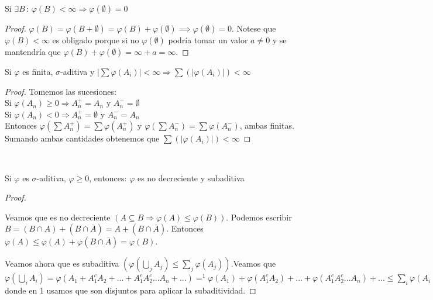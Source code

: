 \begin{lemma}
Si $\exists B\, : \, \varphi(B)<\infty \Rightarrow \varphi(\emptyset)=0$
\end{lemma}
\begin{proof}
  $\varphi(B) =  \varphi(B+\emptyset) = \varphi(B) + \varphi(\emptyset)\implies \varphi(\emptyset) = 0$. Notese que $\varphi(B)<\infty$ es obligado porque si no $\varphi(\emptyset)$ podría tomar un valor $a \neq 0$ y se mantendría que  $\varphi(B) + \varphi(\emptyset) = \infty + a = \infty$.
\end{proof}


\begin{theorem}
Si $\varphi$ es finita, $\sigma$-aditiva y $\displaystyle|\sum\varphi(A_i)|<\infty\Rightarrow\displaystyle\sum(\vert \varphi(A_i)\vert)<\infty$
\end{theorem}
\begin{proof}
Tomemos las sucesiones: \\
Si $\varphi(A_n)\geq 0 \Longrightarrow A_n^{+}=A_n$ y $A_n^{-}=\emptyset$\\
Si $\varphi(A_n)<0 \Longrightarrow A_n^{+}=\emptyset$ y $A_n^{-}=A_n$\\
Entonces $\varphi(\displaystyle\sum A_n^{+})=\displaystyle\sum\varphi(A_n^{+})$ y $\varphi(\displaystyle\sum A_n^{-})=\displaystyle\sum\varphi(A_n^{-})$, ambas finitas. Sumando ambas cantidades obtenemos que $\displaystyle\sum(\vert \varphi(A_i)\vert)<\infty$


\end{proof}

\begin{theorem}
  \ 
  
Si $\varphi$ es $\sigma$-aditiva, $\varphi \geq 0$, entonces: $\varphi$ es no decreciente y subaditiva
\end{theorem}

\begin{proof}
  \
   
Veamos que es no decreciente $(A \subseteq B \Rightarrow \varphi (A) \leq \varphi (B))$. Podemos escribir $B = (B \cap A) + (B \cap \overline{A}) = A + (B \cap \overline{A})$. Entonces $\varphi (A) \leq \varphi (A) + \varphi (B \cap \overline{A}) = \varphi (B)$.

Veamos ahora que es subaditiva $(\varphi(\bigcup_{j} A_j) \le \sum_j \varphi(A_j))$.Veamos que 
$\varphi(\bigcup_{i} A_i) = \varphi(A_1 + A_1^c A_2 + ... + A_1^cA_2^c...A_n+ ...) =^1 \varphi(A_1) + \varphi(A_1^c A_2) + ... + \varphi(A_1^cA_2^c...A_n) + ... \leq  \sum_i \varphi(A_i)$ donde en 1 usamos que son disjuntos para aplicar la subaditividad.

\end{proof}

